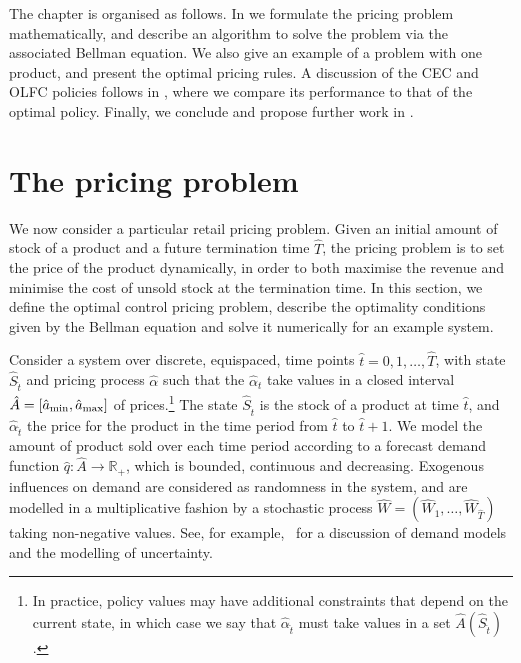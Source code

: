 \documentclass[main.tex]{subfiles}
\begin{document}
The chapter is organised as follows.
In  we formulate the
pricing problem mathematically, and describe an algorithm to solve the
problem via the associated Bellman equation. We also give an example
of a problem with one product, and present the optimal pricing rules.
A discussion of the CEC and OLFC policies follows in
, where we compare its
performance to that of
the optimal policy.
Finally, we conclude and propose further work in .


\section{The pricing problem}\label{sec:bellman_optimal_control}
We now consider a particular retail
pricing problem.
Given an initial amount of stock of a product and a future
termination time $\hat{T}$,
the pricing problem is to
set the price
of the product dynamically, in order to both maximise the revenue and minimise the cost of
unsold stock at the termination time.
In this section, we define the optimal control pricing problem,
describe the optimality conditions given by the Bellman equation and
solve it numerically for an example system.

Consider a system over discrete, equispaced, time points
$\hat{t}=0,1,\dots,\hat{T}$, with state
$\hat{S}_{\hat{t}}$ and pricing process $\hat{\alpha}$ such that the $\hat{\alpha}_t$ take values in a closed
interval $\hat{A}=\nobreak[\hat{a}_{\mathrm{min}},\hat{a}_{\mathrm{max}}]$ of prices.\footnote{In
  practice, policy values may have additional constraints that depend
  on the current state,
  in which case we say that $\hat{\alpha}_{\hat{t}}$ must take values
  in a set $\hat{A}(\hat{S}_{\hat{t}})$.
}
The state $\hat{S}_{\hat{t}}$ is the stock of a product at time $\hat{t}$, and
$\hat{\alpha}_{\hat{t}}$ the price for the product in the time period from $\hat{t}$ to
$\hat{t}+1$. We model the amount of product sold over each time period according
to a forecast demand
function $\hat{q}:\hat{A}\to\mathbb{R}_+$, which is bounded, continuous and decreasing.
Exogenous influences on demand are considered as randomness in the
system, and are
modelled in a multiplicative fashion by a stochastic process
$\hat{W}=(\hat{W}_1,\dots,\hat{W}_{\hat{T}})$ taking non-negative values. See, for
example,~\citet[Ch.~7]{talluri2006theory} for a discussion of
demand models and the modelling of uncertainty.
\end{document}
